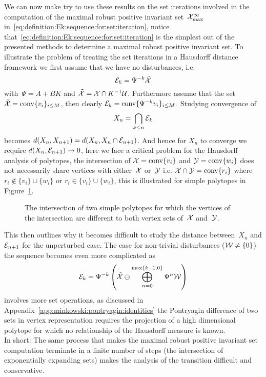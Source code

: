 %
\noindent\mysplit We can now make try to use these results on the set iterations involved in the computation of the maximal robust positive invariant set~$\mathcal X^\infty_{\max}$ in~\eqref{eq:definition:Ek:sequence:for:set:iteration}, notice that~\eqref{eq:definition:Ek:sequence:for:set:iteration} is the simplest out of the presented methods to determine a maximal robust positive invariant set.
%
To illustrate the problem of treating the set iterations in a Hausdorff distance framework we first assume that we have no disturbances, i.e.
%
\begin{equation}
	\mathcal E_k = \Psi^{-k}\tilde{\mathcal X}
\end{equation}
%
with~$\Psi=A+BK$ and $\tilde{\mathcal X}=\mathcal X\cap K^{-1}\mathcal U$. 
%
Furthermore assume that the set~$\tilde{\mathcal X}=\text{conv}\{v_i\}_{i\leq M}$, then clearly $\mathcal E_k = \text{conv}\{\Psi^{-k}v_i\}_{i\leq M}$.
%
Studying convergence of 
%
\[
X_n = \bigcap_{k\leq n}\mathcal E_k
\]
%
becomes $d(X_n,X_{n+1})=d(X_n,X_n\cap \mathcal E_{n+1})$. 
%
And hence for $X_n$ to converge we require $d(X_n,\mathcal E_{n+1})\rightarrow0$, here we face a critical problem for the Hausdorff analysis of polytopes, the intersection of $\mathcal X=\text{conv}\{v_i\}$ and $\mathcal Y=\text{conv}\{w_i\}$ does not necessarily share vertices with either~$\mathcal X$ or~$\mathcal Y$ i.e. $\mathcal X\cap\mathcal Y=\text{conv}\{r_i\}$ where $r_i\not\in\{v_i\}\cup\{w_i\}$ or $r_i\in\{v_i\}\cup\{w_i\}$, this is illustrated for simple polytopes in Figure~\ref{fig:intersection:of:polytopes}.
%
%
\begin{figure}\centering
{}
\caption[Intersection of polytopes]{The intersection of two simple polytopes for which the vertices of the intersection are different to both vertex sets of~$\mathcal X$ and~$\mathcal Y$.}
\label{fig:intersection:of:polytopes}
\end{figure}
%
This then outlines why it becomes difficult to study the distance between~$X_n$ and $\mathcal E_{n+1}$ for the unperturbed case.
%
The case for non-trivial disturbances ($\mathcal W\neq\{0\}$) the sequence becomes even more complicated as
%
\[
\mathcal E_k = \Psi^{-k}\left(\tilde{\mathcal X}\ominus\bigoplus_{n=0}^{\max\{k-1,0\}}\Psi^n\mathcal W\right)
\]
%
involves more set operations, as discussed in Appendix~\ref{app:minkowski:pontryagin:identities} the Pontryagin difference of two sets in vertex representation requires the projection of a high dimensional polytope for which no relationship of the Hausdorff measure is known.
%
\\[1em]
%
In short: The same process that makes the maximal robust positive invariant set computation terminate in a finite number of steps (the intersection of exponentially expanding sets) makes the analysis of the transition difficult and conservative.
